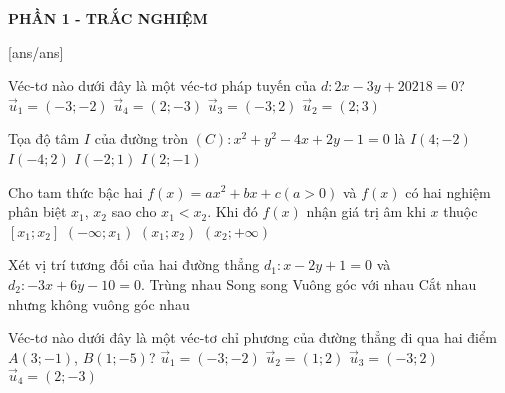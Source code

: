 
\begin{center}
	\textbf{PHẦN 1 - TRẮC NGHIỆM}
\end{center}
[ans/ans]
\begin{ex}%
	Véc-tơ nào dưới đây là một véc-tơ pháp tuyến của $d\colon 2x-3y+20218=0$?
	\choice
	{$\overrightarrow{u}_1=(-3;-2)$}
	{$\overrightarrow{u}_4=(2;-3)$}
	{\True $\overrightarrow{u}_3=(-3;2)$}
	{$\overrightarrow{u}_2=(2;3)$}
\end{ex}
\begin{ex}%
	Tọa độ tâm $I$  của đường tròn $(C)\colon x^2+y^2-4x+2y-1=0$ là
	\choice
	{$I(4;-2)$}
	{$I(-4;2)$}
	{$I(-2;1)$}
	{\True $I(2;-1)$}
\end{ex}
\begin{ex}%
	Cho tam thức bậc hai $f(x) = ax^2 + bx + c (a > 0)$ và $f (x)$ có hai nghiệm phân biệt $x_1$, $x_2$ sao cho $x_1 < x_2$. Khi đó $f (x)$ nhận giá trị âm khi $x$ thuộc
	\choice
	{$[x_1;x_2]$} 
	{$(-\infty;x_1)$}
	{\True $(x_1;x_2)$}
	{$(x_2;+\infty)$}
\end{ex}
\begin{ex}%
	Xét vị trí tương đối của hai đường thẳng $d_1\colon x-2y+1=0$ và \break$d_2\colon -3x+6y-10=0$.
	\choice
	{Trùng nhau}
	{\True Song song}
	{Vuông góc với nhau}
	{Cắt nhau nhưng không vuông góc nhau}
\end{ex}
\begin{ex}%
	Véc-tơ nào dưới đây là một véc-tơ chỉ phương của đường thẳng đi qua hai điểm $A(3;-1)$, $B(1;-5)$?
	\choice
	{$\overrightarrow{u}_1=(-3;-2)$}
	{\True $\overrightarrow{u}_2=(1;2)$}
	{$\overrightarrow{u}_3=(-3;2)$}
	{$\overrightarrow{u}_4=(2;-3)$}
\end{ex}
